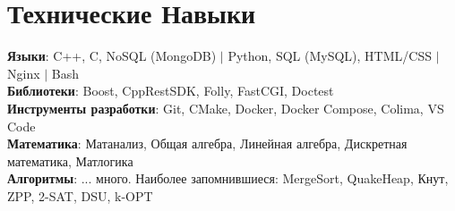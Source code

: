\documentclass[letterpaper,11pt]{article}
\begin{document}
%
\section{Технические Навыки}
 \begin{itemize}[leftmargin=0.15in, label={}]
    \small{\item{
     \textbf{Языки}{: C++, C, NoSQL (MongoDB) $|$ Python, SQL (MySQL), HTML/CSS $|$ Nginx $|$  Bash} \\
     \textbf{Библиотеки}{: Boost, CppRestSDK, Folly, FastCGI, Doctest} \\
     \textbf{Инструменты разработки}{: Git, CMake, Docker, Docker Compose, Colima, VS Code} \\
     \textbf{Математика}{: Матанализ, Общая алгебра, Линейная алгебра, Дискретная математика, Матлогика} \\
     \textbf{Алгоритмы}{: ... много. Наиболее запомнившиеся: MergeSort, QuakeHeap, Кнут, ZPP, 2-SAT, DSU, k-OPT}
    }}
 \end{itemize}



\end{document}
